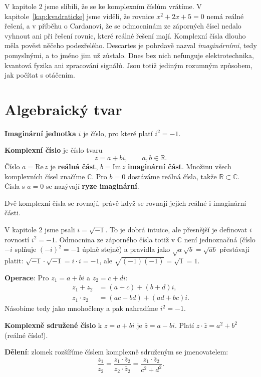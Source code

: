 \label{kap:komplexni}

V kapitole 2 jsme slíbili, že se ke komplexním číslům vrátíme. V kapitole~\ref{kap:kvadraticke} jsme viděli, že rovnice $x^2 + 2x + 5 = 0$ nemá reálné řešení, a v příběhu o Cardanovi, že se odmocninám ze záporných čísel nedalo vyhnout ani při řešení rovnic, které reálné řešení mají. Komplexní čísla dlouho měla pověst něčeho podezřelého. Descartes je pohrdavě nazval \textit{imaginárními}, tedy pomyslnými, a to jméno jim už zůstalo. Dnes bez nich nefunguje elektrotechnika, kvantová fyzika ani zpracování signálů. Jsou totiž jediným rozumným způsobem, jak počítat s otáčením.

\section{Algebraický tvar}\label{sec:algebraicky-tvar}

\begin{definitionbox}
  \textbf{Imaginární jednotka} $i$ je číslo, pro které platí $i^2 = -1$.

  \textbf{Komplexní číslo} je číslo tvaru
  \begin{equation*}
    z = a + bi,\qquad a, b\in\mathbb{R}.
  \end{equation*}
  Číslo $a = \mathrm{Re}\,z$ je \textbf{reálná část}, $b = \mathrm{Im}\,z$ \textbf{imaginární část}. Množinu všech komplexních čísel značíme $\mathbb{C}$. Pro $b = 0$ dostáváme reálná čísla, takže $\mathbb{R}\subset\mathbb{C}$. Čísla s $a = 0$ se nazývají \textbf{ryze imaginární}.

  Dvě komplexní čísla se rovnají, právě když se rovnají jejich reálné i imaginární části.
\end{definitionbox}

V kapitole 2 jsme psali $i = \sqrt{-1}$. To je dobrá intuice, ale přesnější je definovat $i$ rovností $i^2 = -1$. Odmocnina ze záporného čísla totiž v $\mathbb{C}$ není jednoznačná (číslo $-i$ splňuje ${(-i)}^2 = -1$ úplně stejně) a pravidla jako $\sqrt{a}\sqrt{b} = \sqrt{ab}$ přestávají platit: $\sqrt{-1}\cdot\sqrt{-1} = i\cdot i = -1$, ale $\sqrt{(-1)(-1)} = \sqrt{1} = 1$.

\begin{definitionbox}
  \textbf{Operace}: Pro $z_1 = a + bi$ a $z_2 = c + di$:
  \begin{align*}
    z_1 + z_2 &= (a + c) + (b + d)i,\\
    z_1\cdot z_2 &= (ac - bd) + (ad + bc)i.
  \end{align*}
  Násobíme tedy jako mnohočleny a pak nahradíme $i^2 = -1$.

  \textbf{Komplexně sdružené číslo} k $z = a + bi$ je $\bar{z} = a - bi$. Platí $z\cdot\bar{z} = a^2 + b^2$ (reálné číslo!).

  \textbf{Dělení}: zlomek rozšíříme číslem komplexně sdruženým se jmenovatelem:
  \begin{equation*}
    \frac{z_1}{z_2} = \frac{z_1\cdot\bar{z}_2}{z_2\cdot\bar{z}_2} = \frac{z_1\cdot\bar{z}_2}{c^2 + d^2}.
  \end{equation*}
\end{definitionbox}


